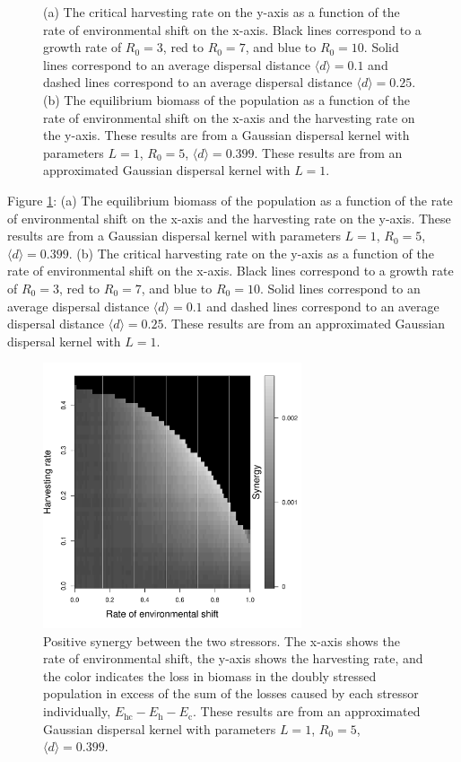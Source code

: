 \documentclass[12pt,english]{article}
\begin{document}
\begin{figure}[htbp]
\caption{(a) The critical harvesting rate on the y-axis as a function of the rate of environmental shift on the x-axis.  Black lines correspond to a growth rate of $R_0=3$, red to $R_0=7$, and blue to $R_0=10$.  Solid lines correspond to an average dispersal distance $\langle d \rangle =0.1$ and dashed lines correspond to an average dispersal distance $\langle d \rangle =0.25$.  (b) The equilibrium biomass of the population as a function of the rate of environmental shift on the x-axis and the harvesting rate on the y-axis. These results are from a Gaussian dispersal kernel with parameters $L=1$, $R_0=5$, $\langle d \rangle = 0.399$.    These results are from an approximated Gaussian dispersal kernel with $L=1$.}

\label{baseline}
\end{figure}

\pagebreak

Figure \ref{baseline}: (a) The equilibrium biomass of the population as a function of the rate of environmental shift on the x-axis and the harvesting rate on the y-axis. These results are from a Gaussian dispersal kernel with parameters $L=1$, $R_0=5$, $\langle d \rangle = 0.399$.  (b) The critical harvesting rate on the y-axis as a function of the rate of environmental shift on the x-axis.  Black lines correspond to a growth rate of $R_0=3$, red to $R_0=7$, and blue to $R_0=10$.  Solid lines correspond to an average dispersal distance $\langle d \rangle =0.1$ and dashed lines correspond to an average dispersal distance $\langle d \rangle =0.25$.  These results are from an approximated Gaussian dispersal kernel with $L=1$.

\pagebreak

\begin{figure}[htbp]
\begin{center}
\includegraphics[width=3in]{plots/synergy.pdf}
\caption{
Positive synergy between the two stressors.  The x-axis shows the rate of environmental shift, the y-axis shows the harvesting rate, and the color indicates the loss in biomass in the doubly stressed population in excess of the sum of the losses caused by each stressor individually, $E_\text{hc}-E_\text{h}-E_\text{c}$.  These results are from an approximated Gaussian dispersal kernel with parameters $L=1$, $R_0=5$, $\langle d \rangle = 0.399$.
}
\label{Synergy}
\end{center}
\end{figure}
\end{document}
